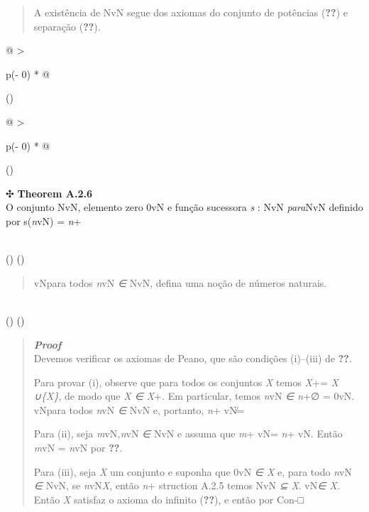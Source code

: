 \documentclass[
]{article}
\begin{document}
\begin{quote}
A existência de NvN segue dos axiomas do conjunto de potências
(\textbf{??}) e separação (\textbf{??}).
\end{quote}

\begin{longtable}[]{@{}
  >{\raggedright\arraybackslash}p{(\columnwidth - 0\tabcolsep) * }@{}}
\toprule()
\begin{minipage}[b]{\linewidth}\raggedright
\begin{longtable}[]{@{}
  >{\raggedright\arraybackslash}p{(\columnwidth - 0\tabcolsep) * }@{}}
\toprule()
\begin{minipage}[b]{\linewidth}\raggedright
✣ \textbf{Theorem A.2.6}\\
O conjunto NvN, elemento zero 0vN e função sucessora \emph{s} : NvN
\emph{para}NvN definido por s(\emph{n}vN) = \emph{n}+\strut
\end{minipage} \\
\midrule()
\endhead
\bottomrule()
\end{longtable}

\begin{quote}
vNpara todos \emph{n}vN \emph{∈} NvN, defina uma noção de números
naturais.
\end{quote}\strut
\end{minipage} \\
\midrule()
\endhead
\bottomrule()
\end{longtable}

\begin{quote}
\emph{\textbf{Proof}}\\
Devemos verificar os axiomas de Peano, que são condições (i)--(iii) de
\textbf{??}.

Para provar (i), observe que para todos os conjuntos \emph{X} temos
\emph{X}+= \emph{X ∪\{X\}}, de modo que \emph{X ∈ X}+. Em particular,
temos \emph{n}vN \emph{∈ n}+∅ = 0vN. vNpara todos \emph{n}vN \emph{∈}
NvN e, portanto, \emph{n}+ vN\emph{̸}=

Para (ii), seja \emph{m}vN\emph{,n}vN \emph{∈} NvN e assuma que
\emph{m}+ vN= \emph{n}+ vN. Então \emph{m}vN = \emph{n}vN por
\textbf{??}.

Para (iii), seja \emph{X} um conjunto e suponha que 0vN \emph{∈ X} e,
para todo \emph{n}vN \emph{∈} NvN, se \emph{n}vN\emph{X}, então
\emph{n}+ struction A.2.5 temos NvN \emph{⊆ X}. vN\emph{∈ X}. Então
\emph{X} satisfaz o axioma do infinito (\textbf{??}), e então por Con-□
\end{quote}
\end{document}
